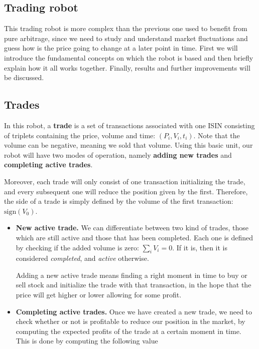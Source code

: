 \documentclass[8 pt]{article}
\begin{document}
\begin{multicols*}{2}

  \section{Trading robot}

  This trading robot is more complex than the previous one used to benefit from pure arbitrage, since we need to study and understand market fluctuations and guess how is the price going to change at a later point in time. First we will introduce the fundamental concepts on which the robot is based and then briefly explain how it all works together. Finally, results and further improvements will be discussed.

  \subsection{Trades}

  In this robot, a \textbf{trade} is a set of transactions associated with one ISIN consisting of triplets containing the price, volume and time: $(P_i, V_i, t_i)$. Note that the volume can be negative, meaning we sold that volume. Using this basic unit, our robot will have two modes of operation, namely \textbf{adding new trades} and \textbf{completing active trades}.

  Moreover, each trade will only consist of one transaction initializing the trade, and every subsequent one will reduce the position given by the first. Therefore, the side of a trade is simply defined by the volume of the first transaction: $\text{sign}(V_0)$.

  \begin{itemize}
    \item \textbf{New active trade.} We can differentiate between two kind of trades, those which are still active and those that has been completed. Each one is defined by checking if the added volume is zero: $\sum_i V_i = 0$. If it is, then it is considered \emph{completed}, and \emph{active} otherwise.

    Adding a new active trade means finding a right moment in time to buy or sell stock and initialize the trade with that transaction, in the hope that the price will get higher or lower allowing for some profit.

    \item \textbf{Completing active trades.} Once we have created a new trade, we need to check whether or not is profitable to reduce our position in the market, by computing the expected profits of the trade at a certain moment in time. This is done by computing the following value


\end{itemize}
\end{multicols*}
\end{document}
